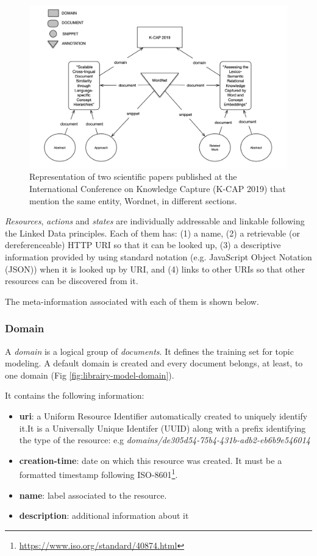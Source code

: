 % 
\begin{figure}
  \center
  \includegraphics[scale=0.55]{model}
  \caption{Representation of two scientific papers published at the International Conference on Knowledge Capture (K-CAP 2019) that mention the same entity, Wordnet, in different sections.}
  \label{fig:librairy-model}
\end{figure}

\textit{Resources}, \textit{actions} and \textit{states} are individually addressable and linkable \cite{Turchi2012a} following the Linked Data principles\cite{Bizer2009}. Each of them has: (1) a name, (2) a retrievable (or dereferenceable) HTTP URI so that it can be looked up, (3) a descriptive information provided by using standard notation (e.g. JavaScript Object Notation (JSON)) when it is  looked up by URI, and (4) links to other URIs so that other resources can be discovered from it.

The meta-information associated with each of them is shown below.

\subsubsection{Domain}

A \textit{domain} is a logical group of \textit{documents}. It defines the training set for topic modeling. A default domain is created and every document belongs, at least, to one domain (Fig \ref{fig:librairy-model-domain}).

It contains the following information: 
\begin{itemize}
\item \textbf{uri}: a Uniform Resource Identifier automatically created to uniquely identify it.It is a Universally Unique Identifer (UUID) along with a prefix identifying the type of the resource: e.g \textit{domains/de305d54-75b4-431b-adb2-eb6b9e546014}
\item \textbf{creation-time}: date on which this resource was created. It must be a formatted timestamp following ISO-8601\footnote{\url{https://www.iso.org/standard/40874.html}}.
\item \textbf{name}: label associated to the resource.
\item \textbf{description}: additional information about it
\end{itemize}

